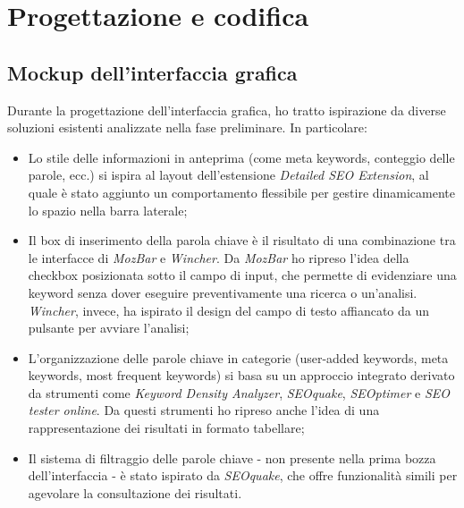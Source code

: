 \chapter{Progettazione e codifica}
\label{cap:progettazione-codifica}


\section{Mockup dell'interfaccia grafica}
\label{sec:mockup}

\par Durante la progettazione dell’interfaccia grafica, ho tratto ispirazione da diverse soluzioni esistenti analizzate nella fase preliminare. In particolare:
\begin{itemize}
    \item Lo stile delle informazioni in anteprima (come meta keywords, conteggio delle parole, ecc.) si ispira al layout dell’estensione \textit{Detailed SEO Extension}, al quale è stato aggiunto un comportamento flessibile per gestire dinamicamente lo spazio nella barra laterale;
    \item Il box di inserimento della parola chiave è il risultato di una combinazione tra le interfacce di \textit{MozBar} e \textit{Wincher}. Da \textit{MozBar} ho ripreso l’idea della checkbox posizionata sotto il campo di input, che permette di evidenziare una keyword senza dover eseguire preventivamente una ricerca o un’analisi. \textit{Wincher}, invece, ha ispirato il design del campo di testo affiancato da un pulsante per avviare l’analisi;
    \item L’organizzazione delle parole chiave in categorie (user-added keywords, meta keywords, most frequent keywords) si basa su un approccio integrato derivato da strumenti come \textit{Keyword Density Analyzer}, \textit{SEOquake}, \textit{SEOptimer} e \textit{SEO tester online}. Da questi strumenti ho ripreso anche l’idea di una rappresentazione dei risultati in formato tabellare;
    \item Il sistema di filtraggio delle parole chiave - non presente nella prima bozza dell’interfaccia - è stato ispirato da \textit{SEOquake}, che offre funzionalità simili per agevolare la consultazione dei risultati.
\end{itemize}

